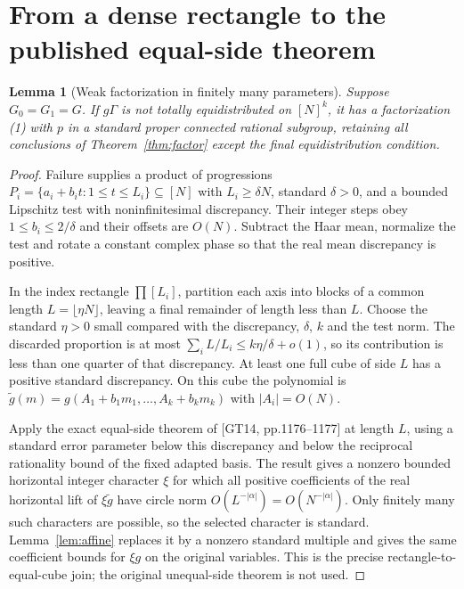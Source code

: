 \documentclass[11pt]{article}
\newtheorem{lemma}[theorem]{Lemma}
\begin{document}
\section{From a dense rectangle to the published equal-side theorem}
\begin{lemma}[Weak factorization in finitely many parameters]\label{lem:weak}
Suppose $G_0=G_1=G$. If $g\Gamma$ is not totally equidistributed on $[N]^k$,
it has a factorization (1) with $p$ in a standard proper connected rational
subgroup, retaining all conclusions of Theorem~\ref{thm:factor} except
the final equidistribution condition.
\end{lemma}
\begin{proof}
Failure supplies a product of progressions
$P_i=\{a_i+b_it:1\leq t\leq L_i\}\subseteq[N]$ with $L_i\geq\delta N$,
standard $\delta>0$, and a bounded Lipschitz test with noninfinitesimal
discrepancy. Their integer steps obey $1\leq b_i\leq2/\delta$ and their
offsets are $O(N)$. Subtract the Haar mean, normalize the test and rotate a
constant complex phase so that the real mean discrepancy is positive.

In the index rectangle $\prod[ L_i]$, partition each axis into blocks of a
common length $L=\lfloor\eta N\rfloor$, leaving a final remainder of length
less than $L$. Choose the standard $\eta>0$ small compared with the
discrepancy, $\delta$, $k$ and the test norm. The discarded proportion is
at most $\sum_iL/L_i\leq k\eta/\delta+o(1)$, so its contribution is less
than one quarter of that discrepancy. At least one full cube of side $L$
has a positive standard discrepancy. On this cube the polynomial is
$\widetilde g(m)=g(A_1+b_1m_1,\ldots,A_k+b_km_k)$ with $|A_i|=O(N)$.

Apply the exact equal-side theorem of [GT14, pp.1176--1177] at length $L$,
using a standard error parameter below this discrepancy and below the
reciprocal rationality bound of the fixed adapted basis. The result gives
a nonzero bounded horizontal integer character $\xi$ for which all positive
coefficients of the real horizontal lift of $\xi\widetilde g$ have circle
norm $O(L^{-|\alpha|})=O(N^{-|\alpha|})$.
Only finitely many such characters are possible, so the selected character
is standard. Lemma~\ref{lem:affine} replaces it by a nonzero standard
multiple and gives the same coefficient bounds for $\xi g$ on the
original variables. This is the precise rectangle-to-equal-cube join;
the original unequal-side theorem is not used.


\end{proof}
\end{document}
